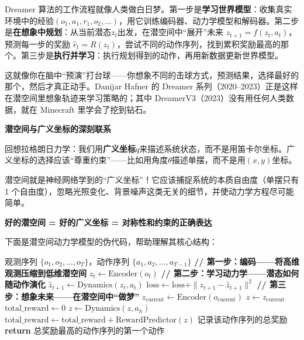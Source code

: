 \begin{example}
Dreamer 算法的工作流程就像人类做白日梦。第一步是\textbf{学习世界模型}：收集真实环境中的经验$(o_1, a_1, r_1, o_2, \ldots)$，用它训练编码器、动力学模型和解码器。第二步是\textbf{在想象中规划}：从当前潜态$z_t$出发，在潜空间中“展开”未来 $z_{t+1} = f(z_t, a_t)$，预测每一步的奖励 $\hat{r}_t = R(z_t)$，尝试不同的动作序列，找到累积奖励最高的那个。第三步是\textbf{执行并学习}：执行规划得到的动作，再用新数据更新世界模型。

这就像你在脑中“预演”打台球——你想象不同的击球方式，预测结果，选择最好的那个，然后才真正动手。Danijar Hafner 的 Dreamer 系列（2020--2023）正是这样在潜空间里想象轨迹来学习策略的；其中 DreamerV3（2023）没有用任何人类数据，就在 Minecraft 里学会了挖到钻石。
\end{example}

\begin{physicalintuition}
\textbf{潜空间与广义坐标的深刻联系}

回想拉格朗日力学：我们用\textbf{广义坐标}$q$来描述系统状态，而不是用笛卡尔坐标。广义坐标的选择应该“尊重约束”——比如用角度$\theta$描述单摆，而不是用$(x, y)$坐标。

潜空间就是神经网络学到的“广义坐标”！它应该捕捉系统的本质自由度（单摆只有 1 个自由度），忽略光照变化、背景噪声这类无关的细节，并使动力学方程尽可能简单。

\textbf{好的潜空间 = 好的广义坐标 = 对称性和约束的正确表达}
\end{physicalintuition}

下面是潜空间动力学模型的伪代码，帮助理解其核心结构：

\begin{algorithm}[H]
\caption{潜空间世界模型的核心流程}
\begin{algorithmic}[1]
\Require 观测序列 $\{o_1, o_2, \ldots, o_T\}$，动作序列 $\{a_1, a_2, \ldots, a_{T-1}\}$
\State \textbf{// 第一步：编码——将高维观测压缩到低维潜空间}
    \State $z_t \gets \text{Encoder}(o_t)$ 
\EndFor
\State \textbf{// 第二步：学习动力学——潜态如何随动作演化}
    \State $\hat{z}_{t+1} \gets \text{Dynamics}(z_t, a_t)$ 
    \State $\text{loss} \gets \text{loss} + \|z_{t+1} - \hat{z}_{t+1}\|^2$ 
\EndFor
\State \textbf{// 第三步：想象未来——在潜空间中“做梦”}
\State $z_{\text{current}} \gets \text{Encoder}(o_{\text{current}})$
    \State $z \gets z_{\text{current}}$
    \State $\text{total\_reward} \gets 0$
        \State $z \gets \text{Dynamics}(z, a_h)$
        \State $\text{total\_reward} \gets \text{total\_reward} + \text{RewardPredictor}(z)$
    \EndFor
    \State 记录该动作序列的总奖励
\EndFor
\State \textbf{return} 总奖励最高的动作序列的第一个动作
\end{algorithmic}
\end{algorithm}

